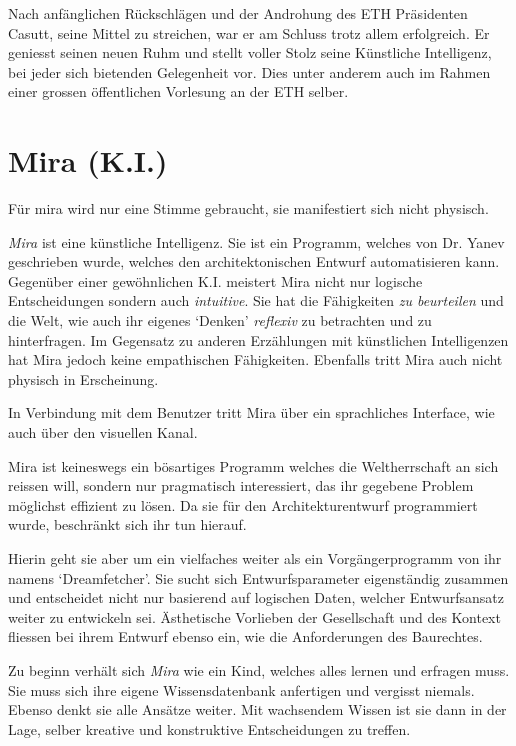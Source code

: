 \documentclass[11pt,a4paper,ngerman]{scrreprt}
\begin{document}
Nach anfänglichen Rückschlägen und der Androhung des ETH Präsidenten Casutt,
seine Mittel zu streichen, war er am Schluss trotz allem erfolgreich. Er
geniesst seinen neuen Ruhm und stellt voller Stolz seine Künstliche Intelligenz,
bei jeder sich bietenden Gelegenheit vor. Dies unter anderem auch im Rahmen
einer grossen öffentlichen Vorlesung an der ETH selber.

\section*{Mira (K.I.)}

Für mira wird nur eine Stimme gebraucht, sie manifestiert sich nicht physisch.

\emph{Mira} ist eine künstliche Intelligenz. Sie ist ein Programm, welches von
Dr. Yanev geschrieben wurde, welches den architektonischen Entwurf
automatisieren kann. Gegenüber einer gewöhnlichen K.I. meistert Mira nicht nur
logische Entscheidungen sondern auch \emph{intuitive}. Sie hat die Fähigkeiten \emph{zu
beurteilen} und die Welt, wie auch ihr eigenes `Denken' \emph{reflexiv} zu betrachten
und zu hinterfragen. Im Gegensatz zu anderen Erzählungen mit künstlichen
Intelligenzen hat Mira jedoch keine empathischen Fähigkeiten. Ebenfalls tritt
Mira auch nicht physisch in Erscheinung.

In Verbindung mit dem Benutzer tritt Mira über ein sprachliches Interface, wie
auch über den visuellen Kanal.

Mira ist keineswegs ein bösartiges Programm welches die Weltherrschaft an sich
reissen will, sondern nur pragmatisch interessiert, das ihr gegebene Problem
möglichst effizient zu lösen. Da sie für den Architekturentwurf programmiert
wurde, beschränkt sich ihr tun hierauf.

Hierin geht sie aber um ein vielfaches weiter als ein Vorgängerprogramm von ihr
namens `Dreamfetcher'. Sie sucht sich Entwurfsparameter eigenständig zusammen
und entscheidet nicht nur basierend auf logischen Daten, welcher Entwurfsansatz
weiter zu entwickeln sei. Ästhetische Vorlieben der Gesellschaft und des Kontext
fliessen bei ihrem Entwurf ebenso ein, wie die Anforderungen des Baurechtes.

Zu beginn verhält sich \emph{Mira} wie ein Kind, welches alles lernen und erfragen
muss. Sie muss sich ihre eigene Wissensdatenbank anfertigen und vergisst
niemals. Ebenso denkt sie alle Ansätze weiter. Mit wachsendem Wissen ist sie
dann in der Lage, selber kreative und konstruktive Entscheidungen zu treffen.
\end{document}
